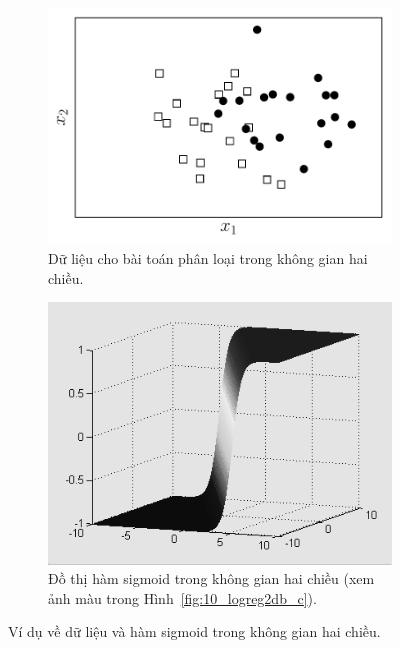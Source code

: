 \begin{figure}[t]
    \begin{subfigure}{0.49\textwidth}
    \includegraphics[width=0.99\linewidth]{ebookML_src/src/logistic_regression/logistic_2d.pdf}
    \caption{Dữ liệu cho bài toán phân loại trong không gian hai chiều.}
    \label{fig:10_logreg2da}
    \end{subfigure}
    \begin{subfigure}{0.45\textwidth}
    \includegraphics[width=0.99\linewidth]{Chapters/05_NeuralNetworks/10_logisticregression/plaszczyzna_gray.png}
    \caption{Đồ thị hàm sigmoid trong không gian hai chiều (xem ảnh màu trong Hình~\ref{fig:10_logreg2db_c}).}
    \label{fig:10_logreg2db}
    \end{subfigure}
    \caption{
        Ví dụ về dữ liệu và hàm sigmoid trong không gian hai chiều.
    }
    \label{fig:10_logreg2d}
\end{figure}



